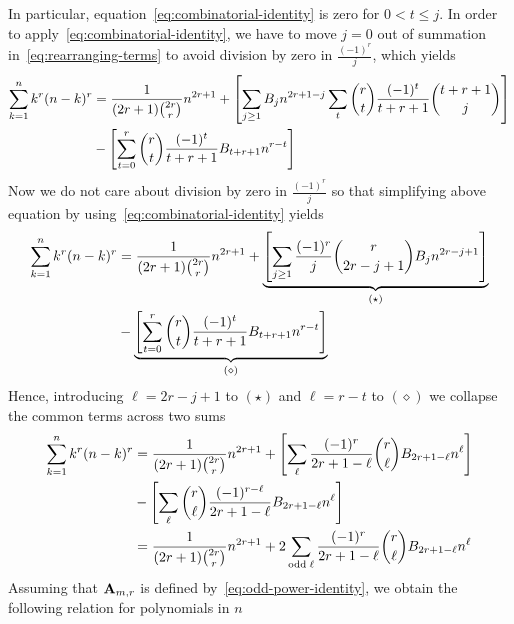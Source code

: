In particular, equation~\eqref{eq:combinatorial-identity} is zero for $0< t \leq j$.
In order to apply~\eqref{eq:combinatorial-identity}, we have to move $j=0$ out of summation
in~\eqref{eq:rearranging-terms} to avoid division by zero in $\frac{(-1)^r}{j}$, which yields
\begin{equation*}
    \begin{split}
        \sum_{k=1}^{n} k^{r} (n-k)^{r}
        &= \frac{1}{(2r+1) \binom{2r}r} n^{2r+1} + \left[ \sum_{j \geq 1} {B}\sb{j} n^{2r+1-j} \sum_{t} \binom{r}{t} \frac{(-1)^t}{t+r+1} \binom{t+r+1}{j} \right] \\
        &- \left[ \sum_{t=0}^{r} \binom{r}{t} \frac{(-1)^t}{t+r+1} {B}\sb{t+r+1} n^{r-t} \right]
    \end{split}
\end{equation*}
Now we do not care about division by zero in $\frac{(-1)^r}{j}$ so that simplifying
above equation by using~\eqref{eq:combinatorial-identity} yields
\begin{equation*}
    \begin{split}
        \sum_{k=1}^{n} k^{r} (n-k)^{r}
        &= \frac{1}{(2r+1) \binom{2r}r} n^{2r+1}
        + \underbrace{\left[ \sum_{j \geq 1} \frac{(-1)^r}{j} \binom{r}{2r-j+1} {B}\sb{j} n^{2r-j+1} \right]}_{(\star)} \\
        &- \underbrace{\left[ \sum_{t=0}^{r} \binom{r}{t} \frac{(-1)^t}{t+r+1} {B}\sb{t+r+1} n^{r-t} \right]}_{(\diamond)}
    \end{split}
\end{equation*}
Hence, introducing $\ell=2r-j+1$ to $(\star)$ and $\ell=r-t$ to $(\diamond)$
we collapse the common terms across two sums
\begin{equation*}
    \begin{split}
        \sum_{k=1}^{n} k^{r} (n-k)^{r}
        &= \frac{1}{(2r+1) \binom{2r}r} n^{2r+1}
        + \left[ \sum_{\ell} \frac{(-1)^r}{2r+1-\ell} \binom{r}{\ell} {B}\sb{2r+1-\ell} n^{\ell} \right] \\
        &- \left[ \sum_{\ell} \binom{r}{\ell} \frac{(-1)^{r-\ell}}{2r+1-\ell} {B}\sb{2r+1-\ell} n^{\ell} \right]\\
        &= \frac{1}{(2r+1) \binom{2r}r} n^{2r+1} + 2 \sum_{\mathrm{odd \; \ell}} \frac{(-1)^r}{2r+1-\ell} \binom{r}{\ell} {B}\sb{2r+1-\ell} n^{\ell}
    \end{split}
\end{equation*}
Assuming that ${\mathbf{A}} \sb{m,r}$ is defined by~\eqref{eq:odd-power-identity},
we obtain the following relation for polynomials in $n$
